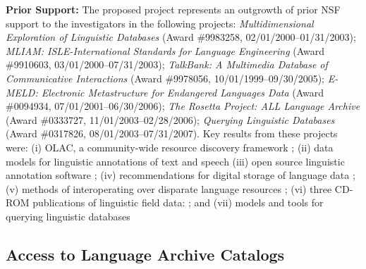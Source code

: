 \textbf{Prior Support:} The proposed project represents an outgrowth of
prior NSF support to the investigators in the following projects:
\textit{Multidimensional Exploration of Linguistic Databases}
  (Award \#9983258, 02/01/2000--01/31/2003);
\textit{MLIAM: ISLE-International Standards for Language Engineering}
  (Award \#9910603, 03/01/2000--07/31/2003);
\textit{TalkBank: A Multimedia Database of Communicative Interactions}
  (Award \#9978056, 10/01/1999--09/30/2005);
\textit{E-MELD: Electronic Metastructure for Endangered Languages Data}
  (Award \#0094934, 07/01/2001--06/30/2006);
\textit{The Rosetta Project: ALL Language Archive}
  (Award \#0333727, 11/01/2003--02/28/2006);
\textit{Querying Linguistic Databases}
  (Award \#0317826, 08/01/2003--07/31/2007).
Key results from these projects were:
(i) OLAC, a community-wide resource discovery framework
\citep{BirdSimons00,BirdSimons00survey,BirdSimons01,BirdSimons02workshop,Simons02query,BirdSimons03chum,SimonsBird03lht,Simons03display,SimonsBird03llc,BirdSimons04metadata};
(ii) data models for linguistic annotations of text and speech
\citep{BirdLiberman01,MaedaBird00,GraffBird00,CottonBird02,CieriBird01,ATLAS00,BirdHarrington01}
(iii) open source linguistic annotation software
\citep{Bird01acl,MaedaBird02,BirdMaeda02,MaLee02};
(iv) recommendations for digital storage of language data
\citep{BirdSimons03language,Simons2006};
(v) methods of interoperating over disparate language resources
\citep{SimonsEtal2004lex,SimonsEtal2004text};
(vi) three CD-ROM publications of linguistic field data:
\citep{BirdBell01,Bird03paradigms,Bird03ngomba};
and
(vii) models and tools for querying linguistic databases
\citep{BirdBuneman01,BirdBunemanTan00,LaiBird04,Bird05planx,Bird06icde}


\subsection{Access to Language Archive Catalogs}


